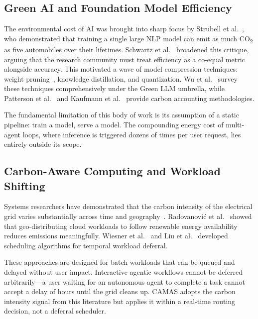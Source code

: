 \documentclass[journal]{IEEEtran}
\begin{document}
\subsection{Green AI and Foundation Model Efficiency}

The environmental cost of AI was brought into sharp focus by
Strubell et al.~\cite{strubell2019energy}, who demonstrated that training a
single large NLP model can emit as much CO\textsubscript{2} as five
automobiles over their lifetimes. Schwartz et al.~\cite{schwartz2020green}
broadened this critique, arguing that the research community must treat
efficiency as a co-equal metric alongside accuracy. This motivated a wave of
model compression techniques: weight pruning~\cite{han2016deep}, knowledge
distillation, and quantization. Wu et al.~\cite{wu2024green} survey these
techniques comprehensively under the Green LLM umbrella, while
Patterson et al.~\cite{patterson2021carbon} and
Kaufmann et al.~\cite{kaufmann2023carbon} provide carbon accounting
methodologies.

The fundamental limitation of this body of work is its assumption of a static
pipeline: train a model, serve a model. The compounding energy cost of
multi-agent loops, where inference is triggered dozens of times per user
request, lies entirely outside its scope.

\subsection{Carbon-Aware Computing and Workload Shifting}

Systems researchers have demonstrated that the carbon intensity of the
electrical grid varies substantially across time and
geography~\cite{masanet2020recalibrating}. Radovanovi\'c et
al.~\cite{radovanovic2022carbon} showed that geo-distributing cloud workloads
to follow renewable energy availability reduces emissions meaningfully.
Wiesner et al.~\cite{wiesner2021lets} and Liu et al.~\cite{liu2023carbon}
developed scheduling algorithms for temporal workload deferral.

These approaches are designed for batch workloads that can be queued and
delayed without user impact. Interactive agentic workflows cannot be deferred
arbitrarily—a user waiting for an autonomous agent to complete a task cannot
accept a delay of hours until the grid cleans up. CAMAS adopts the carbon
intensity signal from this literature but applies it within a real-time
routing decision, not a deferral scheduler.
\end{document}
